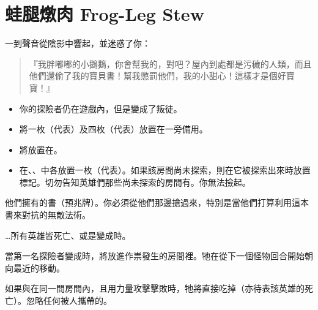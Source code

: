 
\chapter{蛙腿燉肉 Frog-Leg Stew}

\begin{HauntStory}
	一到聲音從陰影中響起，並迷惑了你：
	\begin{quote}
		『我胖嘟嘟的小鵝鵝，你會幫我的，對吧？屋內到處都是污穢的人類，而且他們還偷了我的寶貝書！幫我懲罰他們，我的小甜心！這樣才是個好寶寶！』
	\end{quote}
\end{HauntStory}

\vspace*{-1em}
\begin{itemize}
	\item 你的探險者仍在遊戲內，但是變成了叛徒。
	\item 將一枚（代表）及四枚（代表）放置在一旁備用。
	\item 將放置在。
	\item 在、、中各放置一枚（代表）。如果該房間尚未探索，則在它被探索出來時放置標記。切勿告知英雄們那些尚未探索的房間有。你無法撿起。
\end{itemize}

他們擁有的書（預兆牌）。你必須從他們那邊搶過來，特別是當他們打算利用這本書來對抗的無敵法術。

…所有英雄皆死亡、或是變成時。

當第一名探險者變成時，將放進作祟發生的房間裡。牠在從下一個怪物回合開始朝向最近的移動。

如果與在同一間房間內，且用力量攻擊擊敗時，牠將直接吃掉（亦待表該英雄的死亡）。忽略任何被人攜帶的。

\vfill\null\pagebreak



